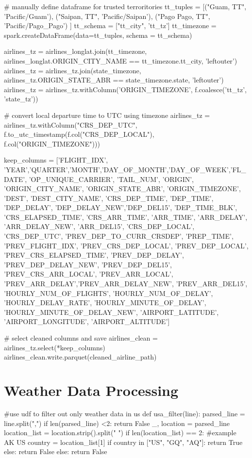 \documentclass[11pt]{article}
\begin{document}
# manually define dataframe for trusted terroritories
tt_tuples = [("Guam, TT",  'Pacific/Guam'), 
             ("Saipan, TT",  'Pacific/Saipan'), 
             ("Pago Pago, TT",  'Pacific/Pago_Pago') ]
tt_schema = ["tt_city",  'tt_tz']
tt_timezone = spark.createDataFrame(data=tt_tuples, schema = tt_schema)

airlines_tz = airlines_longlat.join(tt_timezone, airlines_longlat.ORIGIN_CITY_NAME == tt_timezone.tt_city, 'leftouter')
airlines_tz = airlines_tz.join(state_timezone, airlines_tz.ORIGIN_STATE_ABR == state_timezone.state, 'leftouter')
airlines_tz = airlines_tz.withColumn('ORIGIN_TIMEZONE', f.coalesce('tt_tz', 'state_tz'))

# convert local departure time to UTC using timezone
airlines_tz = airlines_tz.withColumn("CRS_DEP_UTC", f.to_utc_timestamp(f.col("CRS_DEP_LOCAL"), f.col("ORIGIN_TIMEZONE")))

keep_columns = ['FLIGHT_IDX', 'YEAR','QUARTER','MONTH','DAY_OF_MONTH','DAY_OF_WEEK','FL_DATE', 'OP_UNIQUE_CARRIER', 'TAIL_NUM', 
                'ORIGIN', 'ORIGIN_CITY_NAME', 'ORIGIN_STATE_ABR', 'ORIGIN_TIMEZONE', 'DEST', 'DEST_CITY_NAME', 
                'CRS_DEP_TIME', 'DEP_TIME', 'DEP_DELAY', 'DEP_DELAY_NEW','DEP_DEL15', 'DEP_TIME_BLK', 'CRS_ELAPSED_TIME', 
                'CRS_ARR_TIME', 'ARR_TIME', 'ARR_DELAY', 'ARR_DELAY_NEW', 'ARR_DEL15', 
                'CRS_DEP_LOCAL', 'CRS_DEP_UTC', 'PREV_DEP_TO_CURR_CRSDEP', 'PREP_TIME', 
                'PREV_FLIGHT_IDX', 'PREV_CRS_DEP_LOCAL', 'PREV_DEP_LOCAL', 'PREV_CRS_ELAPSED_TIME', 
                'PREV_DEP_DELAY', 'PREV_DEP_DELAY_NEW', 'PREV_DEP_DEL15', 
                'PREV_CRS_ARR_LOCAL', 'PREV_ARR_LOCAL', 'PREV_ARR_DELAY','PREV_ARR_DELAY_NEW', 'PREV_ARR_DEL15',
                'HOURLY_NUM_OF_FLIGHTS', 'HOURLY_NUM_OF_DELAY', 'HOURLY_DELAY_RATE', 'HOURLY_MINUTE_OF_DELAY', 'HOURLY_MINUTE_OF_DELAY_NEW',
                'AIRPORT_LATITUDE', 'AIRPORT_LONGITUDE', 'AIRPORT_ALTITUDE']

# select cleaned columns and save
airlines_clean = airlines_tz.select(*keep_columns)
airlines_clean.write.parquet(cleaned_airline_path)
    \hypertarget{weather-data-processing}{%
\section{Weather Data Processing}\label{weather-data-processing}}
#use udf to filter out only weather data in us
def usa_filter(line):
  parsed_line = line.split(",")
  if len(parsed_line) <2: 
    return False
  _, location = parsed_line
  location_list = location.strip().split(" ")
  if len(location_list) == 2: #example AK US
    country = location_list[1] 
    if country in ["US", "GQ", "AQ"]:
      return True
    else:
      return False
  else:
    return False
\end{document}
